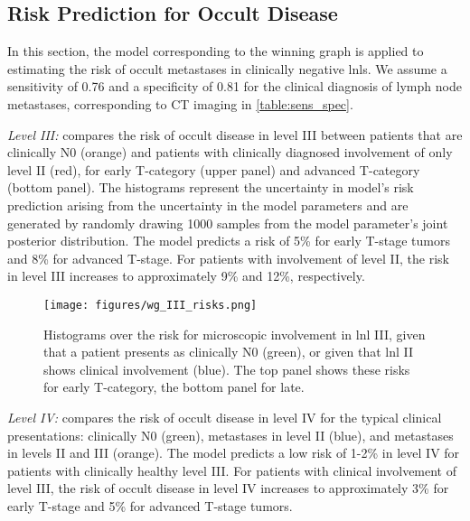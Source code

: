 \documentclass[twocolumn]{aastex631}
\newcommand{\ju}[1]{{\textcolor{red}{#1}}}
\begin{document}
\subsection{Risk Prediction for Occult Disease}
\label{subsec:results:risk_prediction}

In this section, the model corresponding to the winning graph is applied to estimating the risk of occult metastases in clinically negative \glspl{lnl}. We assume a sensitivity of 0.76 and a specificity of 0.81 for the clinical diagnosis of lymph node metastases, corresponding to CT imaging in \cref{table:sens_spec}.

{\it Level III:}  compares the risk of occult disease in level III between patients that are clinically N0 (orange) and patients with clinically diagnosed involvement of only level II (red), for early T-category (upper panel) and advanced T-category (bottom panel). The histograms represent the uncertainty in model's risk prediction arising from the uncertainty in the model parameters and are generated by randomly drawing 1000 samples from the model parameter's joint posterior distribution. The model predicts a risk of 5\% for early T-stage tumors and 8\% for advanced T-stage. For patients with involvement of level II, the risk in level III increases to approximately 9\% and 12\%, respectively.


\begin{figure}
    \begin{centering}
        \texttt{[image: figures/wg\_III\_risks.png]}
        \caption{Histograms over the risk for microscopic involvement in \gls{lnl} III, given that a patient presents as clinically N0 (green), or given that \gls{lnl} II shows clinical involvement (blue). The top panel shows these risks for early T-category, the bottom panel for late.}
        \label{fig:wg_III_risks}
    \end{centering}
\end{figure}

{\it Level IV:}  compares the risk of occult disease in level IV for the typical clinical presentations: clinically N0 (green), metastases in level II (blue), and metastases in levels II and III (orange). The model predicts a low risk of 1-2\% in level IV for patients with clinically healthy level III. For patients with clinical involvement of level III, the risk of occult disease in level IV increases to approximately 3\% for early T-stage and 5\% for advanced T-stage tumors.
\end{document}
